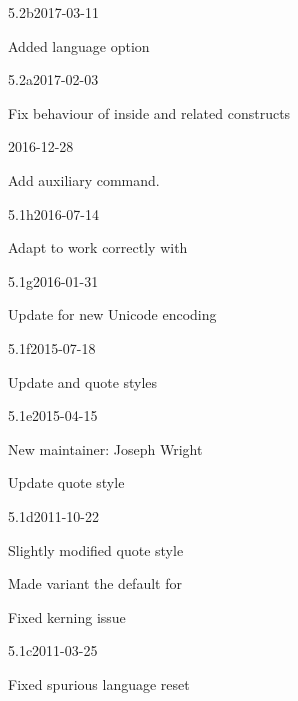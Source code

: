 \documentclass{ltxdockit}[2010/09/26]
\begin{document}
\begin{changelog}
\begin{release}{5.2b}{2017-03-11}
\item Added language option 
\end{release}

\begin{release}{5.2a}{2017-02-03}
	\item Fix behaviour of  inside  and
	  related constructs
\end{release}

\begin{release}{5.2}{2016-12-28}
	\item Add  auxiliary command.
\end{release}

\begin{release}{5.1h}{2016-07-14}
\item Adapt  to work correctly with \luatex
\end{release}

\begin{release}{5.1g}{2016-01-31}
\item Update for new  Unicode encoding
\end{release}

\begin{release}{5.1f}{2015-07-18}
\item Update  and  quote styles
\end{release}

\begin{release}{5.1e}{2015-04-15}
\item New maintainer: Joseph Wright
\item Update  quote style
\end{release}

\begin{release}{5.1d}{2011-10-22}
\item Slightly modified quote style 
\item Made variant  the default for 
\item Fixed \xetex kerning issue
\end{release}

\begin{release}{5.1c}{2011-03-25}
\item Fixed spurious language reset
\end{release}


\end{changelog}
\end{document}
